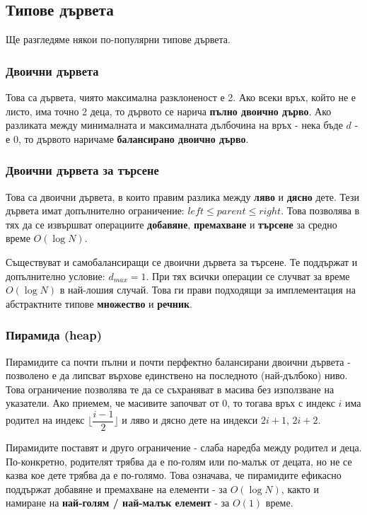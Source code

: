 \documentclass[fleqn,12pt]{article}
\begin{document}
\subsection{Типове дървета}
Ще разгледяме някои по-популярни типове дървета.

\subsubsection{Двоични дървета}
Това са дървета, чиято максимална разклоненост е 2. Ако всеки връх, който не е листо, има точно 2 деца,
то дървото се нарича \textbf{пълно двоично дърво}. Ако разликата между минималната и максималната дълбочина на връх - нека бъде $d$ - е 0, 
то дървото наричаме \textbf{балансирано двоично дърво}.

\subsubsection{Двоични дървета за търсене}
Това са двоични дървета, в които правим разлика между \textbf{ляво} и \textbf{дясно} дете.
Тези дървета имат допълнително ограничение: $left \leq parent \leq right$. 
Това позволява в тях да се извършват операциите \textbf{добавяне}, \textbf{премахване} и \textbf{търсене} за средно време $O(\log N)$.

Съществуват и самобалансиращи се двоични дървета за търсене. Те поддържат и допълнително условие: $d_{max} = 1$. При тях всички операции
се случват за време $O(\log N)$ в най-лошия случай. Това ги прави подходящи за имплементация на абстрактните типове \textbf{множество} и \textbf{речник}.

\subsubsection{Пирамида (heap)}
\label{trees:heap}
Пирамидите са почти пълни и почти перфектно балансирани двоични дървета - позволено е да липсват върхове единствено на последното (най-дълбоко) ниво.
Това ограничение позволява те да се съхраняват в масива без използване на указатели. Ако приемем, че масивите започват от 0, то тогава 
връх с индекс $i$ има родител на индекс $\Bigg\lfloor \dfrac{i - 1}{2} \Bigg\rfloor$ и ляво и дясно дете на индекси $2i + 1$, $2i + 2$.

Пирамидите поставят и друго ограничение - слаба наредба между родител и деца. По-конкретно, родителят трябва да е по-голям или по-малък
от децата, но не се казва кое дете трябва да е по-голямо. Това означава, че пирамидите ефикасно поддържат добавяне и премахване на елементи - за $O(\log N)$,
както и намиране на \textbf{най-голям / най-малък елемент} - за $O(1)$ време.
\end{document}
